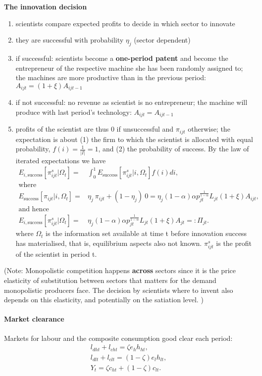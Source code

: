  \textbf{The innovation decision}
 \begin{enumerate}
 	\item scientists compare expected profits to decide in which sector to innovate
 	\item they are successful with probability $\eta_j$ (sector dependent)
 	\item if successful: scientists become a \textbf{one-period patent} and become the entrepreneur of the respective machine she has been randomly assigned to; the machines are more productive than in the previous period: $A_{ijt}=(1+\xi)A_{ijt-1}$
 	\item if not successful: no revenue as scientist is no entrepreneur; the machine will produce with last period's  technology: $A_{ijt}=A_{ijt-1}$
 	\item profits of the scientist are thus 0 if unsuccessful and $\pi_{ijt}$ otherwise; the expectation is about (1) the firm to which the scientist is allocated with equal probability, $f(i)=\frac{1}{|I|}=1$, and (2) the probability of success. By the law of iterated expectations we have
 	\begin{align*}
 	E_{i,\text{success}}[\pi^s_{ijt}| \Omega_t]=& \int_{0}^{1}E_\text{success}[\pi^s_{ijt}|i, \Omega_t]f(i)di,\\ \text{where}&\\
 	E_\text{success}[\pi_{ijt}|i, \Omega_t]=& \eta_j\  \pi_{ijt}+(1-\eta_j)\ 0=\eta_j (1-\alpha)\alpha p_{jt}^\frac{1}{1-\alpha}L_{jt}(1+\xi)A_{ijt},\\
 	\text{and hence}&\\
 	E_{i,\text{success}}[\pi^s_{ijt}| \Omega_t]=&\eta_j (1-\alpha)\alpha p_{jt}^\frac{1}{1-\alpha}L_{jt}(1+\xi)A_{jt}=: \Pi_{jt}.
 	\end{align*}
 	where $\Omega_t$ is the information set available at time t before innovation success has materialised, that is, equilibrium aspects also not known. $\pi^s_{ijt}$ is the profit of the scientist in period t. 
 	
 \end{enumerate}
 (Note: Monopolistic competition happens \textbf{across} sectors since it is the price elasticity of substitution between sectors that matters for the demand monopolistic producers face.
 The decision by scientists where to invent also depends on this elasticity, and potentially on the satiation level. 
 )
 
\paragraph{Market clearance}
Markets for labour and the composite consumption good clear each period:
\begin{align}
l_{dht}+l_{cht}=\zeta e_h h_{ht},\\
l_{dlt}+l_{clt}=(1-\zeta) e_l h_{lt},\\
Y_t=\zeta c_{ht}+(1-\zeta)c_{lt}.
\end{align}

